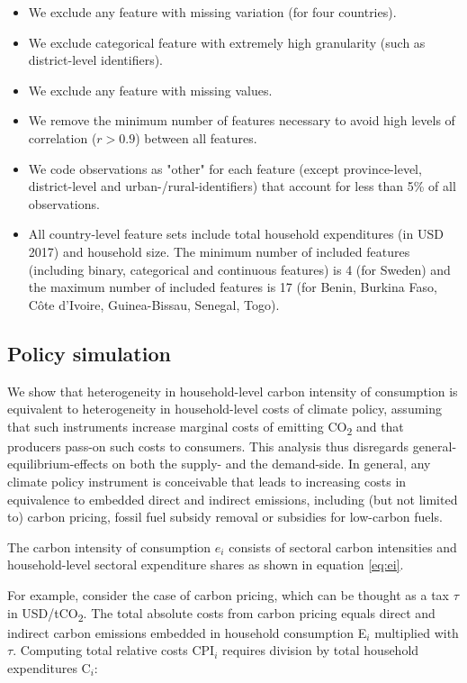 \documentclass[12pt, a4paper]{article}
\begin{document}
\begin{refsection}
\begin{itemize}
    \item We exclude any feature with missing variation (for four countries).
    \item We exclude categorical feature with extremely high granularity (such as district-level identifiers).
    \item We exclude any feature with missing values.
    \item We remove the minimum number of features necessary to avoid high levels of correlation ($r>0.9$) between all features.
    \item We code observations as "other" for each feature (except province-level, district-level and urban-/rural-identifiers) that account for less than 5\% of all observations.
    \item All country-level feature sets include total household expenditures (in USD 2017) and household size. The minimum number of included features (including binary, categorical and continuous features) is 4 (for Sweden) and the maximum number of included features is 17 (for Benin, Burkina Faso, Côte d'Ivoire, Guinea-Bissau, Senegal, Togo).
\end{itemize}

\subsection{Policy simulation}\label{sec:policysimulation}

We show that heterogeneity in household-level carbon intensity of consumption is equivalent to heterogeneity in household-level costs of climate policy, assuming that such instruments increase marginal costs of emitting CO\textsubscript{2} and that producers pass-on such costs to consumers. This analysis thus disregards general-equilibrium-effects on both the supply- and the demand-side. In general, any climate policy instrument is conceivable that leads to increasing costs in equivalence to embedded direct and indirect emissions, including (but not limited to) carbon pricing, fossil fuel subsidy removal or subsidies for low-carbon fuels.

The carbon intensity of consumption $e_{i}$ consists of sectoral carbon intensities and household-level sectoral expenditure shares as shown in equation \ref{eq:ei}. 

For example, consider the case of carbon pricing, which can be thought as a tax $\tau$ in USD/tCO\textsubscript{2}. The total absolute costs from carbon pricing equals direct and indirect carbon emissions embedded in household consumption E$_{i}$ multiplied with $\tau$. Computing total relative costs CPI$_{i}$ requires division by total household expenditures C$_{i}$:


\end{refsection}
\end{document}
